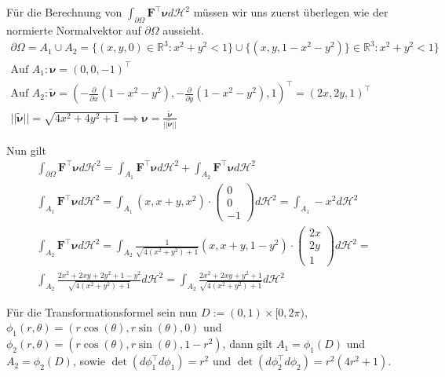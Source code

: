 \documentclass[]{article}
\begin{document}
Für die Berechnung von $\int_{\partial\Omega} \bm{F}^\top \bm{\nu} d\mathcal{H}^2$ müssen wir uns zuerst überlegen wie der normierte Normalvektor auf $\partial\Omega$ aussieht.
\begin{align*}
	\partial\Omega = A_1 \cup A_2 = \{(x,y,0)\in\mathbb{R}^3: x^2+y^2 < 1\} \cup \{(x,y,1-x^2-y^2)\}\in\mathbb{R}^3: x^2+y^2 < 1\}\\
	\text{Auf } A_1: \bm{\nu} = (0,0,-1)^\top\\
	\text{Auf } A_2: \tilde{\bm{\nu}} = \left(-\frac{\partial}{\partial x} (1-x^2-y^2),-\frac{\partial}{\partial y} (1-x^2-y^2), 1\right)^\top = (2x, 2y, 1)^\top\\
	||\tilde{\bm{\nu}}|| = \sqrt{4x^2+4y^2+1} \implies \bm{\nu} = \frac{\tilde{\bm{\nu}}}{||\tilde{\bm{\nu}}||}
\end{align*}

Nun gilt
\begin{align*}
	\int_{\partial\Omega} \bm{F}^\top \bm{\nu} d\mathcal{H}^2 = \int_{A_1} \bm{F}^\top \bm{\nu} d\mathcal{H}^2 + \int_{A_2} \bm{F}^\top \bm{\nu} d\mathcal{H}^2\\
	\int_{A_1} \bm{F}^\top \bm{\nu} d\mathcal{H}^2 = \int_{A_1} (x, x+y, x^2)\cdot \begin{pmatrix}0\\ 0\\ -1\end{pmatrix} d\mathcal{H}^2 = \int_{A_1} -x^2 d\mathcal{H}^2\\
	\int_{A_2} \bm{F}^\top \bm{\nu} d\mathcal{H}^2 = \int_{A_2} \frac{1}{\sqrt{4(x^2+y^2)+1}} (x, x+y, 1-y^2)\cdot \begin{pmatrix}2x\\ 2y\\ 1\end{pmatrix} d\mathcal{H}^2 =\\
	\int_{A_2} \frac{2x^2 + 2xy + 2y^2 + 1 - y^2}{\sqrt{4(x^2+y^2)+1}} d\mathcal{H}^2 = \int_{A_2} \frac{2x^2 + 2xy + y^2 + 1}{\sqrt{4(x^2+y^2)+1}} d\mathcal{H}^2
\end{align*}

Für die Transformationsformel sein nun $D:=(0,1)\times[0,2\pi)$, $\phi_1(r, \theta)=(r\cos(\theta), r\sin(\theta), 0)$ und $\phi_2(r, \theta)=(r\cos(\theta), r\sin(\theta), 1-r^2)$, dann gilt $A_1=\phi_1(D)$ und $A_2=\phi_2(D)$, sowie $\det(d\phi_1^\top d\phi_1) = r^2$ und $\det(d\phi_2^\top d\phi_2) = r^2(4r^2+1)$.
\end{document}
